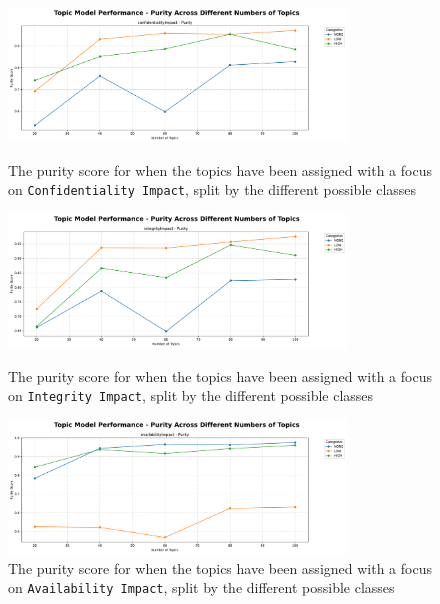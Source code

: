 \documentclass[12pt]{article}
\begin{document}
\begin{figure}[H]
	\centering

	\begin{minipage}[t]{\textwidth}
		\centering
		\includegraphics[width=0.8\textwidth]{figures/purity/topic_model_performance_purity_ground_truth_confidentialityImpact.pdf}
		\caption{The purity score for when the topics have been assigned with a focus on \texttt{Confidentiality Impact}, split by the different possible classes}
		\label{fig:purity_20_confidentiality}
	\end{minipage}

	\begin{minipage}[t]{\textwidth}
		\centering
		\includegraphics[width=0.8\textwidth]{figures/purity/topic_model_performance_purity_ground_truth_integrityImpact.pdf}
		\caption{The purity score for when the topics have been assigned with a focus on \texttt{Integrity Impact}, split by the different possible classes}
		\label{fig:purity_integrity}
	\end{minipage}


	\begin{minipage}[t]{\textwidth}
		\centering
		\includegraphics[width=0.8\textwidth]{figures/purity/topic_model_performance_purity_ground_truth_availabilityImpact.pdf}
		\caption{The purity score for when the topics have been assigned with a focus on \texttt{Availability Impact}, split by the different possible classes}
		\label{fig:purity_20_availability}
	\end{minipage}


\end{figure}
\end{document}
